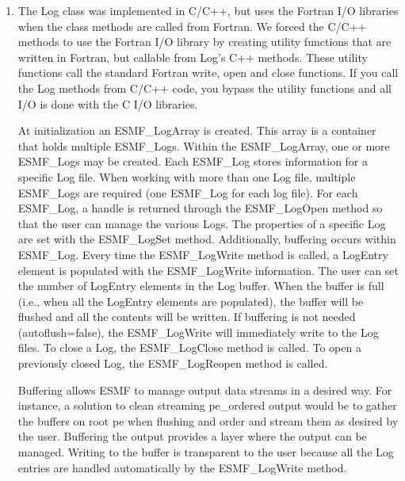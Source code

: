 %


\begin{enumerate}

\item The Log class was implemented in C/C++, but uses the Fortran I/O libraries when
the class methods are called from Fortran. We forced the C/C++ methods 
to use the Fortran I/O library by creating 
utility functions that are written in Fortran, but callable from Log's C++ methods.
These utility functions call the standard Fortran write, open and close functions.
If you call the Log methods from C/C++ code, you bypass the utility functions
and all I/O is done with the C I/O libraries.

At initialization an ESMF_LogArray is created.  This array is a container that holds multiple ESMF_Logs.  Within the ESMF_LogArray, one or more ESMF_Logs may be created.  Each ESMF_Log stores information for a specific Log file.   When working with more than one Log file, multiple ESMF_Logs are required (one ESMF_Log for each log file).  For each ESMF_Log, a handle is returned through the ESMF_LogOpen method so that the user can manage the various Logs.  The properties of a specific Log are set with the ESMF_LogSet method.  Additionally, buffering occurs within ESMF_Log.  Every time the ESMF_LogWrite method is called, a LogEntry element is populated with the ESMF_LogWrite information.  The user can set the number of LogEntry elements in the Log buffer.  When the buffer is full (i.e., when all the LogEntry elements are populated), the buffer will be flushed and all the contents will be written.  If buffering is not needed (autoflush=false), the ESMF_LogWrite will immediately write to the Log files.  To close a Log, the ESMF_LogClose method is called.  To open a previously closed Log, the ESMF_LogReopen method is called.

Buffering allows ESMF to manage output data streams in a desired way.  For instance, a solution to clean streaming pe_ordered output would be to gather the buffers on root pe when flushing and order and stream them as desired by the user.  Buffering the output provides a layer where the output can be managed.  Writing to the buffer is transparent to the user because all the Log entries are handled automatically by the ESMF_LogWrite method. 

\end{enumerate}




